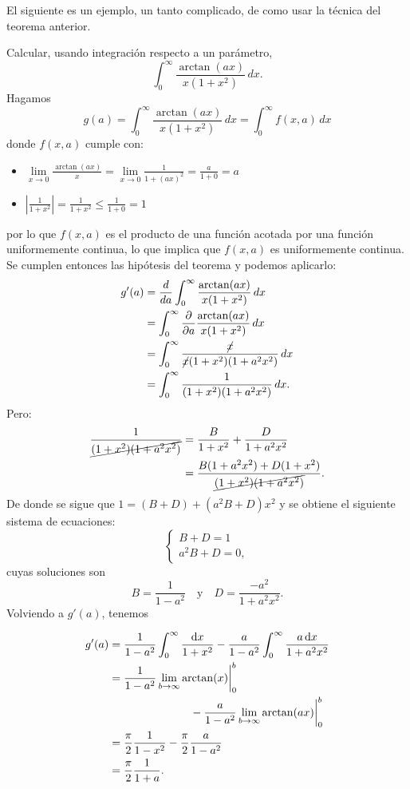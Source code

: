 \documentclass[mid,fleqn,draft,twoside]{notasdeclase}
\newcommand{\inte}[4]{\int_{#1}^{#2} #3\, d#4}
\newcommand{\pd}[1]{\frac{\partial}{\partial #1}}
\newcommand{\der}[1]{\frac{d}{d#1}}
\begin{document}
El siguiente es un ejemplo, un tanto complicado, de como usar la técnica del teorema anterior.
\begin{ejem}
	Calcular, usando integración respecto a un parámetro,
	\[ \inte{0}{\infty}{\frac{\arctan(ax)}{x(1+x^2)}}{x}. \]
	Hagamos
	\[ g(a)= \inte{0}{\infty}{\frac{\arctan(ax)}{x(1+x^2)}}{x} = \inte{0}{\infty}{f(x,a)}{x} \]
	donde $f(x,a)$ cumple con:
	\begin{itemize}
		\item $\displaystyle\lim\limits_{x\to 0} \frac{\arctan(ax)}{x} = \lim\limits_{x\to0}\frac{1}{1+(ax)^2} = \frac{a}{1+0} = a$
		\item $\displaystyle\left| \frac{1}{1+x^2} \right| = \frac{1}{1+x^2}\leq\frac{1}{1+0}=1$
	\end{itemize}
	por lo que $f(x,a)$ es el producto de una función acotada por una función uniformemente continua, lo que implica que $f(x,a)$ es uniformemente continua. Se cumplen entonces las hipótesis del teorema y podemos aplicarlo:
	\begin{align*}
		g'(a) &= \der{a}\inte{0}{\infty}{\frac{\arctan(ax)}{x(1+x^2)}}{x} \\
		      &= \inte{0}{\infty}{\pd{a}\frac{\arctan(ax)}{x(1+x^2)}}{x} \\
		      &= \inte{0}{\infty}{\frac{\cancel{x}}{\cancel{x}(1+x^2)(1+a^2x^2)}}{x} \\
		      &= \inte{0}{\infty}{\frac{1}{(1+x^2)(1+a^2x^2)}}{x}.
	\end{align*}
	Pero:
	\begin{align*}
		\frac{1}{\cancel{(1+x^2)(1+a^2x^2)}} &= \frac{B}{1+x^2} + \frac{D}{1+a^2x^2} \\
											 &= \frac{B(1+a^2x^2) + D(1+x^2)}{\cancel{(1+x^2)(1+a^2x^2)}} .
	\end{align*}
	De donde se sigue que $1=(B+D) + (a^2B+D)x^2$ y se obtiene el siguiente sistema de ecuaciones:
	\[ 
	\begin{cases}
	B+D  =1 \\
	a^2B+D=0,
	\end{cases}
	 \]
	 cuyas soluciones son
	 \[ B=\frac{1}{1-a^2}\quad\text{y}\quad D=\frac{-a^2}{1+a^2x^2}. \]
	 Volviendo a $g'(a)$, tenemos
	 
	 \begin{align*}
	 	g'(a) &= \frac{1}{1-a^2}\int_{0}^{\infty}\frac{\mathrm dx}{1+x^2} - \frac{a}{1-a^2}\int_{0}^{\infty}\frac{a\,\mathrm dx}{1+a^2x^2} \\
	 	      &= \frac{1}{1-a^2}\lim\limits_{b\to\infty}\arctan(x)\bigg|_0^b \\
	 	      &\phantom{=}\hspace{6.5em}- \frac{a}{1-a^2}\lim\limits_{b\to\infty}\arctan(ax)\bigg|_0^b \\
	 	      &=\frac{\pi}{2}\frac{1}{1-x^2} - \frac{\pi}{2}\frac{a}{1-a^2} \\
	 	      &=\frac{\pi}{2}\frac{1}{1+a}.
	 \end{align*}
	 

\end{ejem}
\end{document}
